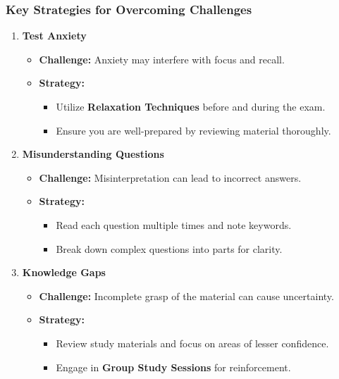 \documentclass{beamer}
\begin{document}
\begin{frame}[fragile]
    \frametitle{Key Strategies for Overcoming Challenges}
    \begin{enumerate}
        \item \textbf{Test Anxiety}
        \begin{itemize}
            \item \textbf{Challenge:} Anxiety may interfere with focus and recall.
            \item \textbf{Strategy:}
            \begin{itemize}
                \item Utilize \textbf{Relaxation Techniques} before and during the exam.
                \item Ensure you are well-prepared by reviewing material thoroughly.
            \end{itemize}
        \end{itemize}

        \item \textbf{Misunderstanding Questions}
        \begin{itemize}
            \item \textbf{Challenge:} Misinterpretation can lead to incorrect answers.
            \item \textbf{Strategy:}
            \begin{itemize}
                \item Read each question multiple times and note keywords.
                \item Break down complex questions into parts for clarity.
            \end{itemize}
        \end{itemize}

        \item \textbf{Knowledge Gaps}
        \begin{itemize}
            \item \textbf{Challenge:} Incomplete grasp of the material can cause uncertainty.
            \item \textbf{Strategy:}
            \begin{itemize}
                \item Review study materials and focus on areas of lesser confidence.
                \item Engage in \textbf{Group Study Sessions} for reinforcement.
            \end{itemize}
        \end{itemize}
    \end{enumerate}
\end{frame}
\end{document}
